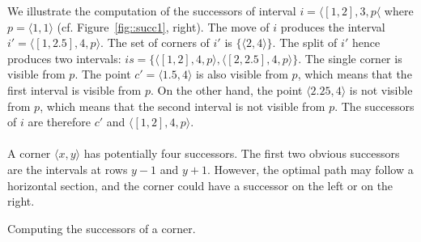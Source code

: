 We illustrate the computation of the successors 
of interval $i = \langle [1,2],3,p\langle$ 
where $p = \langle1,1\rangle$ 
(cf. Figure~\ref{fig::succ1}, right).  
The move of $i$ produces 
the interval $i' = \langle [1,2.5],4,p\rangle$.  
The set of corners of $i'$ is $\{\langle 2,4\rangle\}$.  
The split of $i'$ hence produces two intervals: 
$is = \{
\langle [1,2],4,p\rangle,  
\langle [2,2.5],4,p\rangle
\}$.  
The single corner is visible from $p$.  
The point $c' = \langle 1.5,4\rangle$ is also visible from $p$, 
which means that the first interval is visible from $p$.  
On the other hand, the point $\langle 2.25,4\rangle$ 
is not visible from $p$, 
which means that the second interval is not visible from $p$.  
The successors of $i$ are therefore $c'$ 
and $\langle [1,2],4,p\rangle$.  

\paragraph*{}

A corner $\langle x,y\rangle$ has potentially four successors.  
The first two obvious successors 
are the intervals at rows $y-1$ and $y+1$.  
However, the optimal path may follow a horizontal section, 
and the corner could have a successor on the left or on the right.  

\begin{algorithm}
  
  \caption{Computing the successors of a corner.}
  \label{algo::successorsofacorner}
\end{algorithm}

